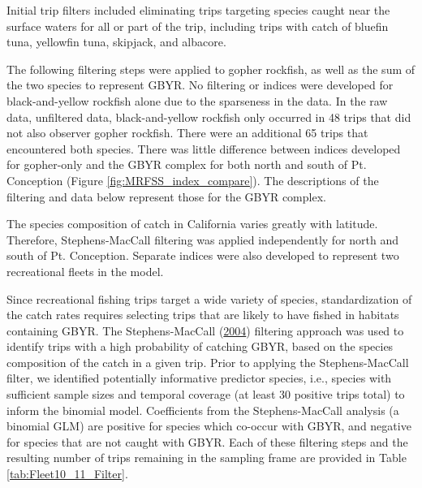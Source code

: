 \documentclass[12pt,]{article}
\begin{document}
Initial trip filters included eliminating trips targeting species caught
near the surface waters for all or part of the trip, including trips
with catch of bluefin tuna, yellowfin tuna, skipjack, and albacore.

The following filtering steps were applied to gopher rockfish, as well
as the sum of the two species to represent GBYR. No filtering or indices
were developed for black-and-yellow rockfish alone due to the sparseness
in the data. In the raw data, unfiltered data, black-and-yellow rockfish
only occurred in 48 trips that did not also observer gopher rockfish.
There were an additional 65 trips that encountered both species. There
was little difference between indices developed for gopher-only and the
GBYR complex for both north and south of Pt. Conception (Figure
\ref{fig:MRFSS_index_compare}). The descriptions of the filtering and
data below represent those for the GBYR complex.

The species composition of catch in California varies greatly with
latitude.\\
Therefore, Stephens-MacCall filtering was applied independently for
north and south of Pt. Conception. Separate indices were also developed
to represent two recreational fleets in the model.

Since recreational fishing trips target a wide variety of species,
standardization of the catch rates requires selecting trips that are
likely to have fished in habitats containing GBYR. The Stephens-MacCall
(\protect\hyperlink{ref-Stephens2004}{2004}) filtering approach was used
to identify trips with a high probability of catching GBYR, based on the
species composition of the catch in a given trip. Prior to applying the
Stephens-MacCall filter, we identified potentially informative predictor
species, i.e., species with sufficient sample sizes and temporal
coverage (at least 30 positive trips total) to inform the binomial
model. Coefficients from the Stephens-MacCall analysis (a binomial GLM)
are positive for species which co-occur with GBYR, and negative for
species that are not caught with GBYR. Each of these filtering steps and
the resulting number of trips remaining in the sampling frame are
provided in Table \ref{tab:Fleet10_11_Filter}.
\end{document}
